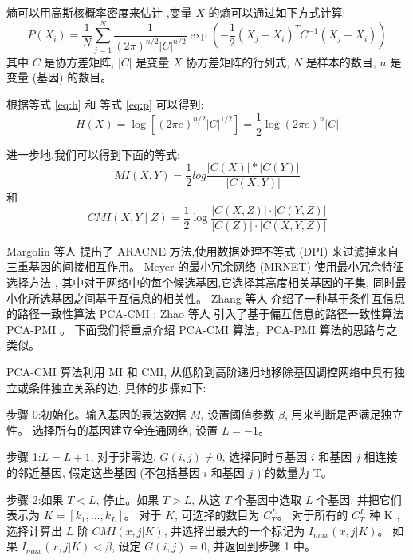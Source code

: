 熵可以用高斯核概率密度来估计 ,变量 $X$ 的熵可以通过如下方式计算:
\begin{equation}
  \label{eq:p}
P\left(X_{i}\right)=\frac{1}{N} \sum_{j=1}^{N} \frac{1}{(2 \pi)^{n / 2}|C|^{n / 2}} \exp \left(-\frac{1}{2}\left(X_{j}-X_{i}\right)^{T} C^{-1}\left(X_{j}-X_{i}\right)\right)
\end{equation}
其中 $C$ 是协方差矩阵, $|C|$ 是变量 $X$ 协方差矩阵的行列式, $N$ 是样本的数目, $n$ 是变量 (基因) 的数目。

根据等式 \ref{eq:h} 和 等式 \ref{eq:p} 可以得到:
\begin{equation}
  H(X)=\log \left[(2 \pi e)^{n / 2}|C|^{1 / 2}\right]=\frac{1}{2} \log (2 \pi e)^{n}|C| 
\end{equation}

进一步地,我们可以得到下面的等式:
\begin{equation}
    MI(X,Y)=\frac{1}{2}log\frac{|C(X)|*|C(Y)|}{|C(X,Y)|}
\end{equation}
和
\begin{equation}
  CMI(X, Y \mid Z)=\frac{1}{2} \log \frac{|C(X, Z)| \cdot|C(Y, Z)|}{|C(Z)| \cdot|C(X, Y, Z)|}
\end{equation}

Margolin 等人 提出了 ARACNE 方法,使用数据处理不等式 (DPI) 来过滤掉来自三重基因的间接相互作用。
Meyer  的最小冗余网络 (MRNET) 使用最小冗余特征选择方法 ,
其中对于网络中的每个候选基因,它选择其高度相关基因的子集, 同时最小化所选基因之间基于互信息的相关性。
Zhang 等人  介绍了一种基于条件互信息的路径一致性算法 PCA-CMI ; 
Zhao 等人  引入了基于偏互信息的路径一致性算法 PCA-PMI 。
下面我们将重点介绍 PCA-CMI 算法，PCA-PMI 算法的思路与之类似。

PCA-CMI 算法利用 MI 和 CMI, 从低阶到高阶递归地移除基因调控网络中具有独立或条件独立关系的边, 具体的步骤如下:

步骤 0:初始化。输入基因的表达数据 $M$, 设置阈值参数 $\beta$, 用来判断是否满足独立性。
选择所有的基因建立全连通网络, 设置 $L=-1$。

步骤 1:$L=L+1$, 对于非零边, $G(i,j) \neq 0$, 选择同时与基因 $i$ 和基因 $j$ 相连接的邻近基因, 
假定这些基因 (不包括基因 $i$ 和基因 $j$ ) 的数量为 T。

步骤 2:如果 $T<L$, 停止。如果 $T>L$, 从这 $T$ 个基因中选取 $L$ 个基因, 
并把它们表示为 $K=[k_1,\ldots,k_L]$。
对于 $K$, 可选择的数目为 $C_T^L$。
对于所有的 $C_T^L$ 种 K ,选择计算出 $L$ 阶 $CMI(x,j|K)$,
并选择出最大的一个标记为 $I_{max}(x,j|K)$。
如果 $I_{max}(x,j|K) < \beta$, 设定 $G(i,j)=0$, 并返回到步骤 1 中。

